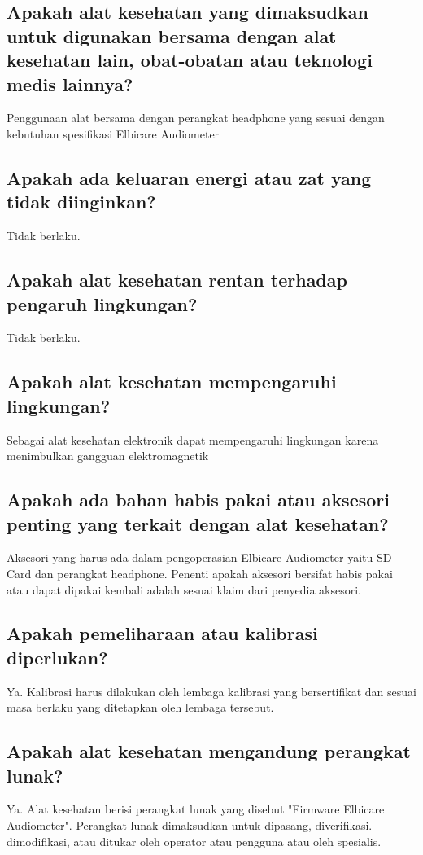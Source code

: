 \documentclass[11pt,a4paper,twoside,draft,onecolumn]{book}
\begin{document}
			\subsection{Apakah alat kesehatan yang dimaksudkan untuk digunakan bersama dengan alat kesehatan lain, obat-obatan atau teknologi medis lainnya?}
			Penggunaan alat bersama dengan perangkat headphone yang sesuai dengan kebutuhan spesifikasi Elbicare Audiometer
			
			\subsection{Apakah ada keluaran energi atau zat yang tidak diinginkan?}
			Tidak berlaku.
			
			\subsection{Apakah alat kesehatan rentan terhadap pengaruh lingkungan?}
			Tidak berlaku.
			
			\subsection{Apakah alat kesehatan mempengaruhi lingkungan?}
			Sebagai alat kesehatan elektronik dapat mempengaruhi lingkungan karena menimbulkan gangguan elektromagnetik
			
			\subsection{Apakah ada bahan habis pakai atau aksesori penting yang terkait dengan alat kesehatan?}
			Aksesori yang harus ada dalam pengoperasian Elbicare Audiometer yaitu SD Card dan perangkat headphone. Penenti apakah aksesori bersifat habis pakai atau dapat dipakai kembali adalah sesuai klaim dari penyedia aksesori.
			
			\subsection{Apakah pemeliharaan atau kalibrasi diperlukan?}
			Ya. Kalibrasi harus dilakukan oleh lembaga kalibrasi yang bersertifikat dan sesuai masa berlaku yang ditetapkan oleh lembaga tersebut.
			
			\subsection{Apakah alat kesehatan mengandung perangkat lunak?}
			Ya. Alat kesehatan berisi perangkat lunak yang disebut "Firmware Elbicare Audiometer". Perangkat lunak dimaksudkan untuk dipasang, diverifikasi. dimodifikasi, atau ditukar oleh operator atau pengguna atau oleh spesialis.
			
\end{document}
